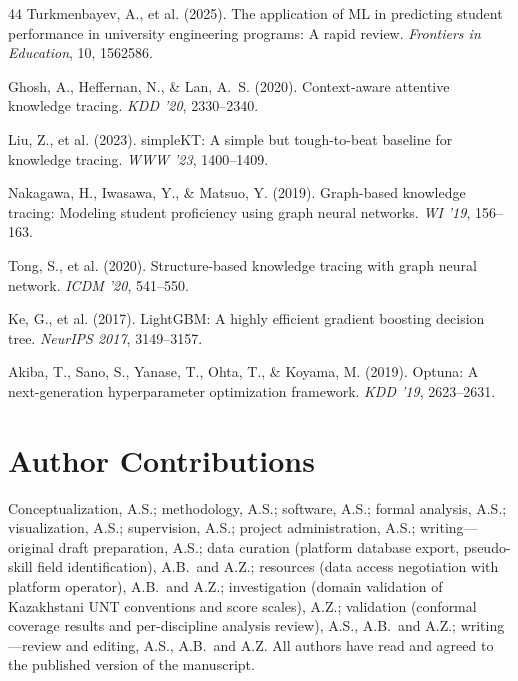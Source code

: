 \documentclass[11pt]{article}
\begin{document}
\begin{thebibliography}{44}
Turkmenbayev, A., et al. (2025). The application of ML in predicting student performance
in university engineering programs: A rapid review. \textit{Frontiers in Education}, 10,
1562586.


Ghosh, A., Heffernan, N., \& Lan, A.~S. (2020).
Context-aware attentive knowledge tracing.
\textit{KDD '20}, 2330--2340.

Liu, Z., et al. (2023).
simpleKT: A simple but tough-to-beat baseline for knowledge tracing.
\textit{WWW '23}, 1400--1409.

Nakagawa, H., Iwasawa, Y., \& Matsuo, Y. (2019).
Graph-based knowledge tracing: Modeling student proficiency using graph neural networks.
\textit{WI '19}, 156--163.

Tong, S., et al. (2020).
Structure-based knowledge tracing with graph neural network.
\textit{ICDM '20}, 541--550.

Ke, G., et al. (2017).
LightGBM: A highly efficient gradient boosting decision tree.
\textit{NeurIPS 2017}, 3149--3157.

Akiba, T., Sano, S., Yanase, T., Ohta, T., \& Koyama, M. (2019).
Optuna: A next-generation hyperparameter optimization framework.
\textit{KDD '19}, 2623--2631.

\end{thebibliography}


\section*{Author Contributions}
Conceptualization, A.S.; methodology, A.S.; software, A.S.; formal analysis, A.S.;
visualization, A.S.; supervision, A.S.; project administration, A.S.;
writing---original draft preparation, A.S.;
data curation (platform database export, pseudo-skill field identification), A.B.\ and A.Z.;
resources (data access negotiation with platform operator), A.B.\ and A.Z.;
investigation (domain validation of Kazakhstani UNT conventions and score scales), A.Z.;
validation (conformal coverage results and per-discipline analysis review), A.S., A.B.\ and A.Z.;
writing---review and editing, A.S., A.B.\ and A.Z.
All authors have read and agreed to the published version of the manuscript.
\end{document}

